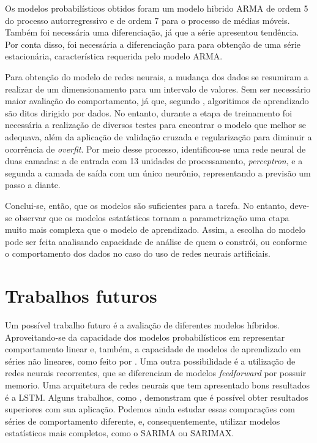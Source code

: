 \documentclass[
    12pt,
    oneside,
    a4paper,
    english,
    brazil
]{abntex2}
\begin{document}
Os modelos probabilísticos  obtidos foram um modelo hibrido ARMA  de ordem 5 do
processo autorregressivo e de ordem 7  para o processo de médias móveis. Também
foi  necessária uma  diferenciação, já  que a  série apresentou  tendência. Por
conta disso,  foi necessária a  diferenciação para  para obtenção de  uma série
estacionária, característica requerida pelo modelo ARMA\@.

Para obtenção do  modelo de redes neurais,  a mudança dos dados  se resumiram a
realizar de um dimensionamento para um intervalo de valores. Sem ser necessário
maior  avaliação   do  comportamento,  já  que,   segundo  ,
algoritimos de aprendizado são ditos dirigido  por dados. No entanto, durante a
etapa  de treinamento  foi  necessária  a realização  de  diversos testes  para
encontrar  o modelo  que melhor  se adequava,  além da  aplicação de  validação
cruzada e  regularização para  diminuir a  ocorrência de  \textit{overfit}. Por
meio  desse processo,  identificou-se uma  rede neural  de duas  camadas: a  de
entrada com  13 unidades de  processamento, \textit{perceptron}, e a  segunda a
camada de  saída com  um único  neurônio, representando a  previsão um  passo a
diante.

Conclui-se, então,  que os modelos são  suficientes para a tarefa.  No entanto,
deve-se observar que os modelos  estatísticos tornam a parametrização uma etapa
muito mais  complexa que o  modelo de aprendizado.  Assim, a escolha  do modelo
pode ser feita analisando capacidade de análise de quem o constrói, ou conforme
o comportamento dos dados no caso do uso de redes neurais artificiais.

\section{Trabalhos futuros}

Um  possível trabalho  futuro é  a  avaliação de  diferentes modelos  híbridos.
Aproveitando-se  da  capacidade  dos  modelos  probabilísticos  em  representar
comportamento  linear  e,  também,  a  capacidade  de  modelos  de  aprendizado
em  séries não  lineares, como  feito por  .
Uma  outra possibilidade  é  a  utilização de  redes  neurais recorrentes,  que
se  diferenciam  de  modelos  \textit{feedforward}  por  possuir  memorio.  Uma
arquitetura de  redes neurais que tem  apresentado bons resultados é  a LSTM\@.
Alguns  trabalhos, como  , demonstram
que  é  possível  obter  resultados   superiores  com  sua  aplicação.  Podemos
ainda  estudar essas  comparações  com séries  de  comportamento diferente,  e,
consequentemente, utilizar  modelos estatísticos mais completos,  como o SARIMA
ou SARIMAX\@.

\postextual


\end{document}

